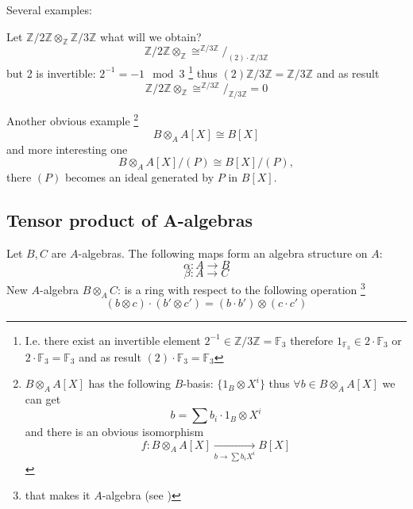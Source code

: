 Several examples:
\begin{example}
  Let $\mathbb{Z}/2\mathbb{Z} \otimes_\mathbb{Z}
  \mathbb{Z}/3\mathbb{Z}$ what will we obtain?
  \[
  \mathbb{Z}/2\mathbb{Z} \otimes_\mathbb{Z} \cong
  ^{\mathbb{Z}/3\mathbb{Z}}/_{(2) \cdot \mathbb{Z}/3\mathbb{Z}}
  \]
  but 2 is invertible: $2^{-1} = -1 \mod 3$
  \footnote{
    I.e. there exist an invertible element $2^{-1} \in
    \mathbb{Z}/3\mathbb{Z} = \mathbb{F}_3$ therefore
    $1_{\mathbb{F}_3} \in 2 \cdot \mathbb{F}_3$ or
    $2 \cdot \mathbb{F}_3 = \mathbb{F}_3$ and as result
    $(2) \cdot \mathbb{F}_3 = \mathbb{F}_3$
  }
  thus
  $(2)\mathbb{Z}/3\mathbb{Z} =\mathbb{Z}/3\mathbb{Z}$ and as result
   \[
  \mathbb{Z}/2\mathbb{Z} \otimes_\mathbb{Z} \cong
  ^{\mathbb{Z}/3\mathbb{Z}}/_{ \mathbb{Z}/3\mathbb{Z}} = 0
  \]
\end{example}

\begin{example}
  Another obvious example
  \footnote {
    $B \otimes_A A\left[X\right]$ has the following $B$-basis:
    $\{1_B \otimes X^i\}$ thus
    $\forall b \in B \otimes_A A\left[X\right]$ we can get
    \[
    b = \sum b_i \cdot 1_B \otimes X^i
    \]
    and there is an obvious isomorphism
    \[
    f: B \otimes_A A\left[X\right]
    \xrightarrow[b \to \sum b_i X^i]{}
    B\left[X\right]
    \]
  }
  \[
  B \otimes_A A\left[X\right] \cong B\left[X\right]
  \]
  and more interesting one
  \[
  B \otimes_A A\left[X\right]/(P) \cong B\left[X\right]/(P),
  \]
  there $(P)$ becomes an ideal generated by $P$ in
  $B\left[X\right]$.
  \label{ex:lec4_1}
\end{example}

\subsection{Tensor product of A-algebras}

Let $B, C$ are $A$-algebras. The following maps form an algebra
structure on $A$:
\[
\alpha: A \to B
\]
\[
\beta: A \to C
\]
New $A$-algebra $B \otimes_A C$: is a ring with respect to the
following operation
\footnote{
  that makes it $A$-algebra (see )
}
\begin{equation}
\left(b \otimes c \right) \cdot \left(b' \otimes c'\right) =
\left(b \cdot b'\right) \otimes \left(c \cdot c'\right)
\label{eq:lec4_algebra_tensor_product}
\end{equation}

